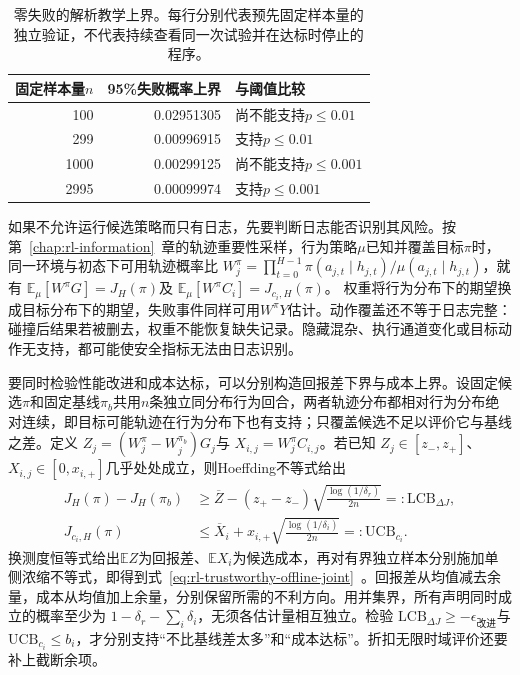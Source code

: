 \begin{table}[htbp]
  \centering
  \begin{tabular}{@{}rrl@{}}
    \toprule
    固定样本量$n$ & 95\%失败概率上界 & 与阈值比较 \\
    \midrule
    100  & 0.02951305 & 尚不能支持$p\leq0.01$ \\
    299  & 0.00996915 & 支持$p\leq0.01$ \\
    1000 & 0.00299125 & 尚不能支持$p\leq0.001$ \\
    2995 & 0.00099974 & 支持$p\leq0.001$ \\
    \bottomrule
  \end{tabular}
  \caption{零失败的解析教学上界。每行分别代表预先固定样本量的独立验证，不代表持续查看同一次试验并在达标时停止的程序。}
  \label{tab:rl-trustworthy-zero-failure}
\end{table}

如果不允许运行候选策略而只有日志，先要判断日志能否识别其风险。按第~\ref{chap:rl-information}~章的轨迹重要性采样，行为策略$\mu$已知并覆盖目标$\pi$时，同一环境与初态下可用轨迹概率比
$W_j^\pi=\prod_{t=0}^{H-1}\pi(a_{j,t}\mid h_{j,t})/
\mu(a_{j,t}\mid h_{j,t})$，就有
$\mathbb E_\mu[W^\pi G]=J_H(\pi)$及
$\mathbb E_\mu[W^\pi C_i]=J_{c_i,H}(\pi)$。
权重将行为分布下的期望换成目标分布下的期望，失败事件同样可用$W^\pi Y$估计。动作覆盖还不等于日志完整：碰撞后结果若被删去，权重不能恢复缺失记录。隐藏混杂、执行通道变化或目标动作无支持，都可能使安全指标无法由日志识别。

要同时检验性能改进和成本达标，可以分别构造回报差下界与成本上界。设固定候选$\pi$和固定基线$\pi_b$共用$n$条独立同分布行为回合，两者轨迹分布都相对行为分布绝对连续，即目标可能轨迹在行为分布下也有支持；只覆盖候选不足以评价它与基线之差。定义
$Z_j=(W_j^\pi-W_j^{\pi_b})G_j$与
$X_{i,j}=W_j^\pi C_{i,j}$。若已知
$Z_j\in[z_-,z_+]$、$X_{i,j}\in[0,x_{i,+}]$几乎处处成立，则Hoeffding不等式给出
\begin{align}
  J_H(\pi)-J_H(\pi_b)
     &\geq \overline Z
        -(z_+-z_-)\sqrt{\frac{\log(1/\delta_r)}{2n}}
        =:\mathrm{LCB}_{\Delta J}, \nonumber\\
  J_{c_i,H}(\pi)
     &\leq \overline X_i
        +x_{i,+}\sqrt{\frac{\log(1/\delta_i)}{2n}}
        =:\mathrm{UCB}_{c_i}.
  \label{eq:rl-trustworthy-offline-joint}
\end{align}
换测度恒等式给出$\mathbb E Z$为回报差、$\mathbb E X_i$为候选成本，再对有界独立样本分别施加单侧浓缩不等式，即得到式~\eqref{eq:rl-trustworthy-offline-joint}~。回报差从均值减去余量，成本从均值加上余量，分别保留所需的不利方向。用并集界，所有声明同时成立的概率至少为
$1-\delta_r-\sum_i\delta_i$，无须各估计量相互独立。检验
$\mathrm{LCB}_{\Delta J}\geq-\epsilon_{\text{改进}}$与
$\mathrm{UCB}_{c_i}\leq b_i$，才分别支持“不比基线差太多”和“成本达标”。折扣无限时域评价还要补上截断余项。

